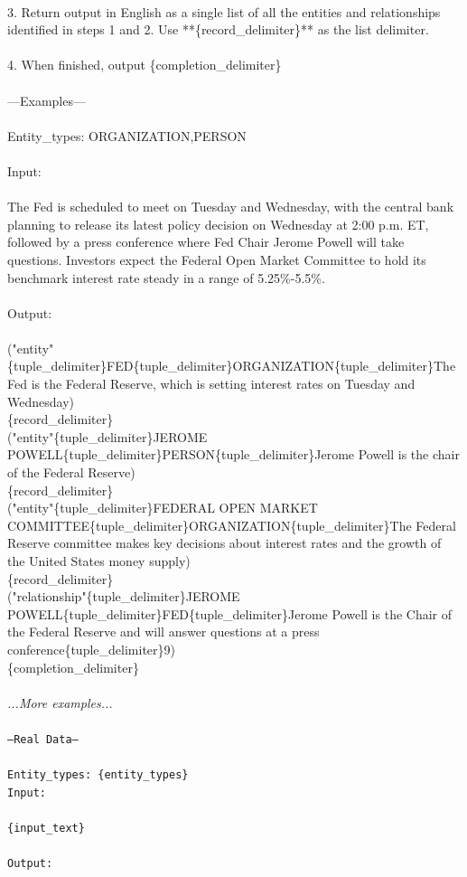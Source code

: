 {\\
3. Return output in English as a single list of all the entities and relationships identified in steps 1 and 2. Use **\{record\_delimiter\}** as the list delimiter.\\
\\
4. When finished, output \{completion\_delimiter\}\\
\\
---Examples---\\
\\
Entity\_types: ORGANIZATION,PERSON\\
\\
Input:\\
\\
The Fed is scheduled to meet on Tuesday and Wednesday, with the central bank planning to release its latest policy decision on Wednesday at 2:00 p.m. ET, followed by a press conference where Fed Chair Jerome Powell will take questions. Investors expect the Federal Open Market Committee to hold its benchmark interest rate steady in a range of 5.25\%-5.5\%.\\
\\
Output:\\
\\
("entity"\{tuple\_delimiter\}FED\{tuple\_delimiter\}ORGANIZATION\{tuple\_delimiter\}The Fed is the Federal Reserve, which is setting interest rates on Tuesday and Wednesday)\\
\{record\_delimiter\}\\
("entity"\{tuple\_delimiter\}JEROME POWELL\{tuple\_delimiter\}PERSON\{tuple\_delimiter\}Jerome Powell is the chair of the Federal Reserve)\\
\{record\_delimiter\}\\
("entity"\{tuple\_delimiter\}FEDERAL OPEN MARKET COMMITTEE\{tuple\_delimiter\}ORGANIZATION\{tuple\_delimiter\}The Federal Reserve committee makes key decisions about interest rates and the growth of the United States money supply)\\
\{record\_delimiter\}\\
("relationship"\{tuple\_delimiter\}JEROME POWELL\{tuple\_delimiter\}FED\{tuple\_delimiter\}Jerome Powell is the Chair of the Federal Reserve and will answer questions at a press conference\{tuple\_delimiter\}9)\\
\{completion\_delimiter\}\\
}
\textit{\\
...More examples...\\
\\}
\texttt{---Real Data---\\
\\
Entity\_types: \{entity\_types\}\\
Input:\\
\\
\{input\_text\}\\
\\
Output:}

